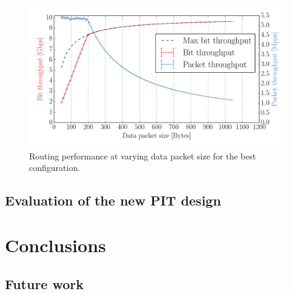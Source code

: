 \documentclass[11pt,a4paper,twoside,titlepage,openany]{book}
\begin{document}
\todo[inline]{}

\begin{figure}[htb]
  \begin{center}
    \includegraphics[width=1.0\textwidth]{img/augustus_increasing_len_0xF.pdf}
    \caption[Routing performance ]{Routing performance at varying data packet size for the best configuration.}
    \label{fig:test.multicore.incr_len}
  \end{center}
\end{figure}

\todo[inline]{}

\section{Evaluation of the new PIT design}\label{sec:test.pit}

\todo[inline]{}



\chapter{Conclusions}


\section{Future work}
\label{sec:future-work}



\end{document}
